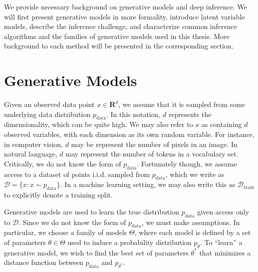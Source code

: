 We provide necessary background on generative models and deep  inference. We will first present generative models in more formality, introduce latent variable models, describe the inference challenge, and characterize common inference algorithms and the families of generative models used in this thesis. More background to each method will be presented in the corresponding section.

\section{Generative Models}

Given an observed data point $x \in \mathbf{R}^d$, we assume that it is sampled from some underlying data distribution $p_{\text{data}}$. In this notation, $d$ represents the dimensionality, which can be quite high. We may also refer to $x$ as containing $d$ observed variables, with each dimension as its own random variable. For instance, in computer vision, $d$ may be represent the number of pixels in an image. In natural language, $d$ may represent the number of tokens in a vocabulary set. Critically, we do not know the form of $p_{\text{data}}$. Fortunately though, we assume access to a dataset of points i.i.d. sampled from $p_{\text{data}}$, which we write as $\mathcal{D} = \{ x : x \sim  p_{\text{data}}\}$. In a machine learning setting, we may also write this as $\mathcal{D}_{\text{train}}$ to explicitly denote a training split.

Generative models are used to learn the true distribution $p_{\text{data}}$ given access only to $\mathcal{D}$. Since we do not know the form of $p_{\text{data}}$, we must make assumptions. In particular, we choose a family of models $\Theta$, where each model is defined by a set of parameters $\theta \in \Theta$ used to induce a probability distribution $p_\theta$. To ``learn'' a generative model, we wish to find the best set of parameters $\theta^*$ that minimizes a distance function between $p_{\text{data}}$ and $p_{\theta^*}$.

